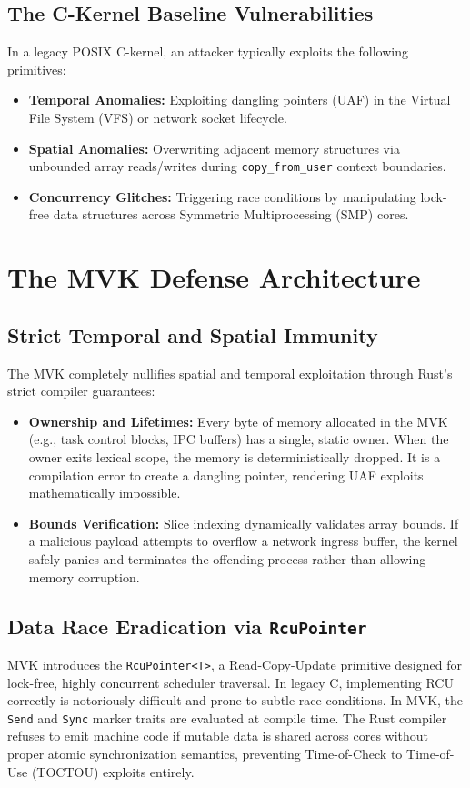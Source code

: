 \documentclass[conference]{IEEEtran}
\begin{document}
\subsection{The C-Kernel Baseline Vulnerabilities}
In a legacy POSIX C-kernel, an attacker typically exploits the following primitives:
\begin{itemize}
    \item \textbf{Temporal Anomalies:} Exploiting dangling pointers (UAF) in the Virtual File System (VFS) or network socket lifecycle.
    \item \textbf{Spatial Anomalies:} Overwriting adjacent memory structures via unbounded array reads/writes during \texttt{copy\_from\_user} context boundaries.
    \item \textbf{Concurrency Glitches:} Triggering race conditions by manipulating lock-free data structures across Symmetric Multiprocessing (SMP) cores.
\end{itemize}

\section{The MVK Defense Architecture}

\subsection{Strict Temporal and Spatial Immunity}
The MVK completely nullifies spatial and temporal exploitation through Rust's strict compiler guarantees:
\begin{itemize}
    \item \textbf{Ownership and Lifetimes:} Every byte of memory allocated in the MVK (e.g., task control blocks, IPC buffers) has a single, static owner. When the owner exits lexical scope, the memory is deterministically dropped. It is a compilation error to create a dangling pointer, rendering UAF exploits mathematically impossible.
    \item \textbf{Bounds Verification:} Slice indexing dynamically validates array bounds. If a malicious payload attempts to overflow a network ingress buffer, the kernel safely panics and terminates the offending process rather than allowing memory corruption.
\end{itemize}

\subsection{Data Race Eradication via \texttt{RcuPointer}}
MVK introduces the \texttt{RcuPointer<T>}, a Read-Copy-Update primitive designed for lock-free, highly concurrent scheduler traversal. In legacy C, implementing RCU correctly is notoriously difficult and prone to subtle race conditions.
In MVK, the \texttt{Send} and \texttt{Sync} marker traits are evaluated at compile time. The Rust compiler refuses to emit machine code if mutable data is shared across cores without proper atomic synchronization semantics, preventing Time-of-Check to Time-of-Use (TOCTOU) exploits entirely.
\end{document}
